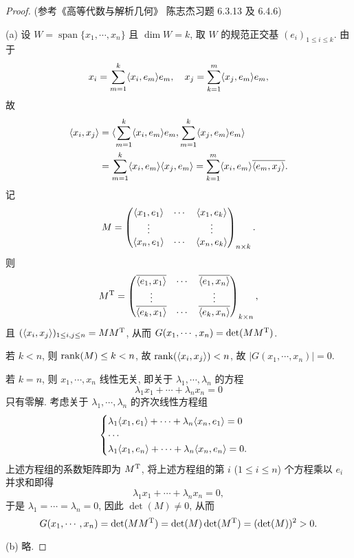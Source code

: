 \begin{proof}
    (参考《高等代数与解析几何》 陈志杰习题 6.3.13 及 6.4.6)

    (a) 设 $W=\operatorname{span}\{x_1,\cdots,x_n\}$ 且 $\dim W=k$,
    取 $W$ 的规范正交基 $(e_i)_{1\leq i\leq k}$. 由于
    \[x_i=\sum_{m=1}^k \langle x_i,e_m\rangle e_m,\quad x_j=\sum_{k=1}^m \langle x_j,e_m\rangle e_m,\]
    故
    \begin{align*}
        \langle x_i,x_j\rangle
        &=\langle\sum_{m=1}^k \langle x_i,e_m\rangle e_m,\sum_{m=1}^k \langle x_j,e_m\rangle e_m\rangle \\
        &=\sum_{m=1}^k \langle x_i,e_m\rangle\langle x_j,e_m\rangle=\sum_{k=1}^m \langle x_i,e_m\rangle\overline{\langle e_m,x_j\rangle}.
    \end{align*}
    记
    \[M=\begin{pmatrix}
        \langle x_1,e_1\rangle & \cdots & \langle x_1,e_k\rangle \\
        \vdots            &        & \vdots            \\
        \langle x_n,e_1\rangle & \cdots & \langle x_n,e_k\rangle
    \end{pmatrix}_{n\times k}.\]
    则
    \[M^{\mathrm{T}}
    =\begin{pmatrix}
        \overline{\langle e_1,x_1\rangle} & \cdots & \overline{\langle e_1,x_n\rangle} \\
        \vdots & & \vdots \\
        \overline{\langle e_k,x_1\rangle} & \cdots & \overline{\langle e_k,x_n\rangle} 
    \end{pmatrix}_{k\times n},\]
    且 $(\langle x_i,x_j\rangle)_{1\leq i,j\leq n}=MM^{\mathrm{T}}$, 从而 $G(x_1,\cdots,x_n)=\det(MM^{\mathrm{T}})$.

    若 $k<n$, 则 $\operatorname{rank}(M)\leq k<n$, 故 $\operatorname{rank}(\langle x_i,x_j\rangle)<n$, 故 $|G(x_1,\cdots,x_n)|=0$.

    若 $k=n$, 则 $x_1,\cdots, x_n$ 线性无关,
    即关于 $\lambda_1,\cdots,\lambda_n$ 的方程
    \[\lambda_1 x_1+\cdots+\lambda_nx_n=0\]
    只有零解. 考虑关于 $\lambda_1,\cdots,\lambda_n$ 的齐次线性方程组
    \[\begin{cases}
        \lambda_1\langle x_1,e_1\rangle+\cdots+\lambda_n\langle x_n,e_1\rangle=0 \\
        \cdots \\
        \lambda_1\langle x_1,e_n\rangle+\cdots+\lambda_n\langle x_n,e_n\rangle=0.
    \end{cases}\]
    上述方程组的系数矩阵即为 $M^{\mathrm{T}}$, 将上述方程组的第 $i$ ($1\leq i\leq n$) 个方程乘以 $e_i$ 并求和即得
    \[\lambda_1x_1+\cdots+\lambda_nx_n=0,\]
    于是 $\lambda_1=\cdots=\lambda_n=0$, 因此 $\det(M)\neq 0$,
    从而 
    \[G(x_1,\cdots,x_n)=\det(MM^{\mathrm{T}})=\det(M)\det(M^{\mathrm{T}})=(\det(M))^2>0.\]

    (b) 略.
\end{proof}




